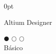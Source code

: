 \documentclass[a4paper]{article}
\begin{document}
\begin{adjustwidth}{\parindent}{0pt}
\begin{minipage}[t]{0.25\textwidth}
  \begin{minipage}{0.65\textwidth}
   \small{Altium Designer}
 \end{minipage}
 \begin{minipage}{0.3\textwidth}
   \centering $\mdlgblkcircle$ $\mdlgwhtcircle$ $\mdlgwhtcircle$ \\  \footnotesize{Básico}
 \end{minipage} \\ \hspace{0pt} \\

\end{minipage}
\end{adjustwidth}
\end{document}
